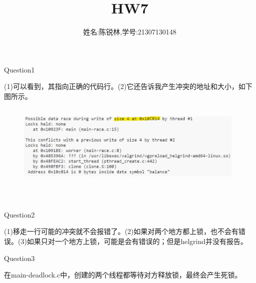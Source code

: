 \documentclass[11pt]{article}
\title{HW7}
\author{姓名:陈锐林,学号:21307130148}
\begin{document}
\maketitle
\begin{large}
	\noindent Question1\\
\end{large}
\hspace*{2em}(1)可以看到，其指向正确的代码行。(2)它还告诉我产生冲突的地址和大小，如下图所示。
\begin{figure}[h]
    \includegraphics[width=11cm,height=4cm]{p7-1.jpg}
    \centering
\end{figure}\\
\begin{large}
	\noindent Question2\\
\end{large}
\hspace*{2em}(1)移走一行可能的冲突就不会报错了。(2)如果对两个地方都上锁，也不会有错误。(3)如果只对一个地方上锁，可能是会有错误的；但是helgrind并没有报告。\\

\begin{large}
	\noindent Question3\\
\end{large}
\hspace*{2em}在main-deadlock.c中，创建的两个线程都等待对方释放锁，最终会产生死锁。\\
\end{document}
